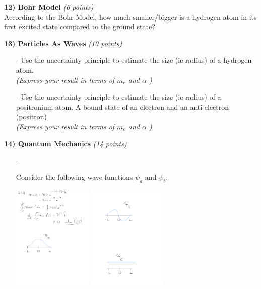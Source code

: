 {\clearpage

\textbf{12) Bohr Model} \hfill \textit{(6 points)}\\
According to the Bohr Model, how much smaller/bigger is a hydrogen atom in its first excited state compared to the ground state?

\vfill

\textbf{13) Particles As Waves } \hfill \textit{(10 points)}\\
\begin{itemize}
\item[-] Use the uncertainty principle to estimate the size (ie radius) of a hydrogen atom. \\ \textit{(Express your result in terms of $m_e$ and $\alpha$ )}
\vfill
\item[-] Use the uncertainty principle to estimate the size (ie radius) of a positronium atom. A bound state of an electron and an anti-electron (positron) \\ \textit{(Express your result in terms of $m_e$ and $\alpha$ )}
\vfill
\end{itemize}


\clearpage

\begin{minipage}{\textwidth}
\textbf{14) Quantum Mechanics} \hfill \textit{(14 points)}
\begin{itemize}
\item[-] {Consider the following wave functions $\psi_a$ and $\psi_b$:

\begin{center}
\includegraphics[width=0.3\textwidth]{./psia.pdf}
\hspace{0.3in}
\includegraphics[width=0.3\textwidth]{./psib.pdf}
\end{center}

}
\end{itemize}
\end{minipage}}
